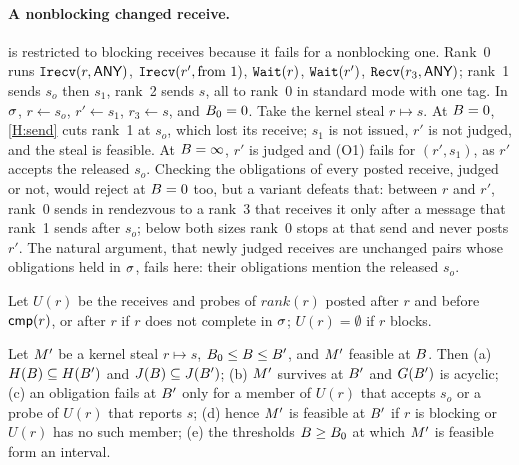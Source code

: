 \paragraph{A nonblocking changed receive.}
 is restricted to blocking receives because it fails for a nonblocking one.
Rank~0 runs $\texttt{Irecv}(r,\textsf{ANY})$, $\texttt{Irecv}(r',\text{from }1)$,
$\texttt{Wait}(r)$, $\texttt{Wait}(r')$, $\texttt{Recv}(r_3,\textsf{ANY})$; rank~1 sends $s_o$ then
$s_1$, rank~2 sends $s$, all to rank~0 in standard mode with one tag. In $\sigma$, $r\gets s_o$,
$r'\gets s_1$, $r_3\gets s$, and $B_0=0$. Take the kernel steal $r\mapsto s$. At $B=0$,
\ref{H:send} cuts rank~1 at $s_o$, which lost its receive; $s_1$ is not issued, $r'$ is not
judged, and the steal is feasible. At $B=\infty$, $r'$ is judged and (O1) fails for
$(r',s_1)$, as $r'$ accepts the released $s_o$. Checking the obligations of every posted
receive, judged or not, would reject at $B=0$ too, but a variant defeats that: between $r$
and $r'$, rank~0 sends in rendezvous to a rank~3 that receives it only after a message that
rank~1 sends after $s_o$; below both sizes rank~0 stops at that send and never posts $r'$. The
natural argument, that newly judged receives are unchanged pairs whose obligations held in
$\sigma$, fails here: their obligations mention the released $s_o$.

Let $U(r)$ be the receives and probes of $\mathit{rank}(r)$ posted after $r$ and before
$\mathsf{cmp}(r)$, or after $r$ if $r$ does not complete in $\sigma$; $U(r)=\emptyset$ if $r$ blocks.

\begin{theorem}\label{thm:app-mono}
Let $M'$ be a kernel steal $r\mapsto s$, $B_0\le B\le B'$, and $M'$ feasible at
$B$. Then (a) $H(B)\subseteq H(B')$ and $J(B)\subseteq J(B')$;
(b) $M'$ survives at $B'$ and $G(B')$ is acyclic; (c) an obligation fails at
$B'$ only for a member of $U(r)$ that accepts $s_o$ or a probe of $U(r)$ that reports $s$;
(d) hence $M'$ is feasible at $B'$ if $r$ is blocking or $U(r)$ has no such member;
(e) the thresholds $B\ge B_0$ at which $M'$ is feasible form an interval.
\end{theorem}

